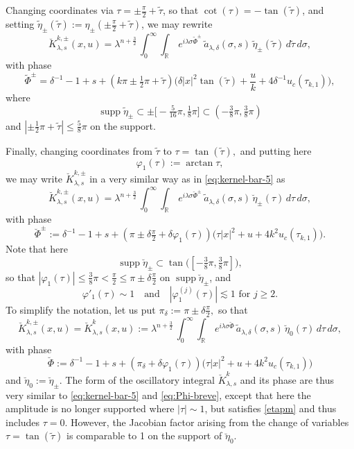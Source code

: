 \documentclass[leqno]{amsart}
\theoremstyle{definition}
\theoremstyle{remark}
\numberwithin{equation}{section}
\newcommand{\R}{\mathbb{R}}
\DeclareMathOperator*{\supp}{supp}
\newcommand\la{{\lambda}}
\newcommand\de{{\delta}}
\begin{document}
Changing  coordinates via $\tau=\pm \tfrac\pi2+\tilde\tau$, so that $\cot(\tau)=-\tan(\tilde \tau)$, and setting $\tilde \eta_{\pm}(\tilde \tau):=\eta_{\pm}(\pm\tfrac\pi 2+\tilde\tau)$, we may rewrite
\begin{equation}\label{eq:kernel-kpm}
\breve K_{\lambda,s}^{k,\pm}(x,u) = \lambda^{n + \frac 32}\,  \int_0^\infty \int_\R \, e^{i \lambda \sigma \tilde \Phi^\pm} \,\tilde a_{\la,\de}(\sigma,s) \, \tilde\eta_{\pm}(\tilde \tau)\, d  \tilde\tau \, d\sigma,
\end{equation}
with phase 
\begin{equation}\label{eq:Phi-pm}
\tilde \Phi^\pm = \delta^{-1}-1+s +\left(k\pi \pm \tfrac12\pi+\tilde\tau\right) \Big(\delta |x|^2 \tan(\tilde\tau)+\frac {u}{k} +4\delta^{-1} u_c(\tau_{k,1})\Big),
\end{equation}
where 
$$
\supp \tilde\eta_\pm\subset\pm \big[-\tfrac{5}{16}\pi,\tfrac{1}{8}\pi\big]\subset (-\tfrac{3}{8}\pi,\tfrac{3}{8}\pi)
$$
and $|\pm \tfrac12\pi+\tilde\tau|\le \tfrac 58 \pi$ on  the support.

\smallskip
Finally, changing coordinates from $\tilde \tau $ to  $\tau =\tan (\tilde\tau),$ and putting here 
$$\varphi_1(\tau):=\arctan{\tau},$$
we may write $\breve K_{\lambda,s}^{k,\pm}$ in a very similar way as in \eqref{eq:kernel-bar-5} as
\begin{equation}\label{eq:kernel-lis1}
\breve K_{\lambda,s}^{k,\pm}(x,u) = \lambda^{n + \frac 32}\,  \int_0^\infty \int_\R \, e^{i \lambda \sigma \breve \Phi^\pm} \,\tilde a_{\la,\de}(\sigma,s) \, \breve\eta_{\pm}(\tau)\, d  \tau \, d\sigma,
\end{equation}
with phase 
\begin{equation}\label{eq:Phi-breve1}
\breve \Phi^\pm := \delta^{-1}-1 + s + (\pi \pm \delta\tfrac{\pi} 2+\delta   \varphi_1(\tau)) \big( {\tau}|x|^2 +u
+ 4 k^2 u_c(\tau_{k,1})\big).
\end{equation}
Note that here 
\begin{equation}\label{etapm}
\supp \breve\eta_\pm\subset \tan \big([-\tfrac{3}{8}\pi,\tfrac{3}{8}\pi]\big),
\end{equation}
so that $|\varphi_1(\tau)|\le \tfrac 38 \pi <\frac\pi 2\le \pi \pm \delta\tfrac{\pi} 2$ on $ \supp \breve\eta_\pm$, and
\[
\varphi'_1(\tau)\sim 1 \quad\text{and}\quad
|\varphi^{(j)}_1(\tau)|\lesssim1 \text{ for } j\ge 2.
\]
To simplify the notation, let us put $\pi_\de:=\pi \pm \delta\tfrac{\pi} 2,$ so that 
\[
\breve K_{\lambda,s}^{k,\pm}(x,u)=\breve K_{\lambda,s}^k (x,u)
:= \lambda^{n + \frac 32}\,  \int_0^\infty \int_\R \, e^{i \lambda \sigma \breve \Phi} \,\tilde a_{\la,\de}(\sigma,s) \, \breve\eta_0(\tau)\, d  \tau \, d\sigma,
\]
with phase  
\[
\breve \Phi := \delta^{-1}-1 + s + (\pi_\delta+\delta  \varphi_1(\tau)) \big( {\tau}|x|^2 +u
+ 4 k^2 u_c(\tau_{k,1})\big)
\]
and $\breve\eta_0:=\breve\eta_\pm$. The  form of the  oscillatory integral  $\breve K_{\lambda,s}^k $ and its phase are  thus very similar to \eqref{eq:kernel-bar-5} and \eqref{eq:Phi-breve}, except that here the amplitude is no longer  supported where $|\tau| \sim 1$, but  satisfies \eqref{etapm} and thus includes $\tau=0$. However, the Jacobian factor arising from the change of variables $\tau=\tan(\tilde\tau)$ is comparable to 1 on the support of $\breve\eta_{0}$.
\end{document}
